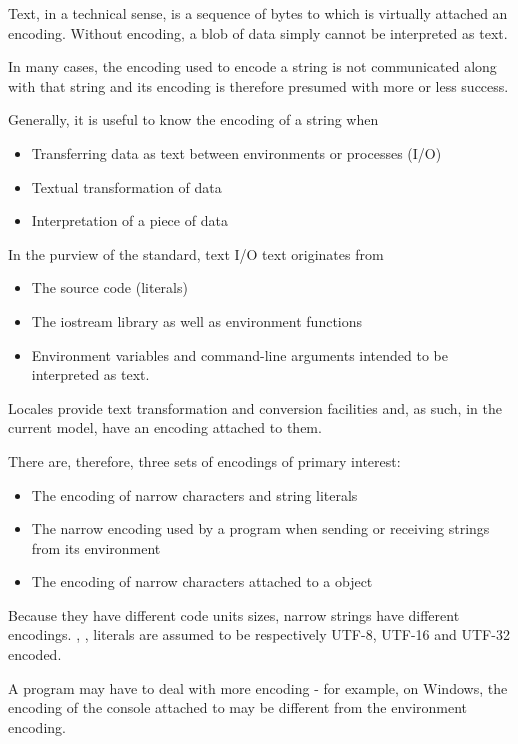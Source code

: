 \documentclass{wg21}
\begin{document}
Text, in a technical sense, is a sequence of bytes to which is virtually attached an encoding.
Without encoding, a blob of data simply cannot be interpreted as text.

In many cases, the encoding used to encode a string is not communicated along with that string and its
encoding is therefore presumed with more or less success.

Generally, it is useful to know the encoding of a string when

\begin{itemize}
    \item Transferring data as text between environments or processes (I/O)
    \item Textual transformation of data
    \item Interpretation of a piece of data
\end{itemize}

In the purview of the standard, text I/O text originates from
\begin{itemize}
    \item The source code (literals)
    \item The iostream library as well as environment functions
    \item Environment variables and command-line arguments intended to be interpreted as text.
\end{itemize}

Locales provide text transformation and conversion facilities and, as such, in the current model, have an encoding attached to them.

There are, therefore, three sets of encodings of primary interest:

\begin{itemize}
    \item The encoding of narrow characters and string literals
    \item The narrow encoding used by a program when sending or receiving strings from its environment
    \item The encoding of narrow characters attached to a  object
\end{itemize}

\note Because they have different code units sizes, narrow strings have different encodings.
, ,  literals are assumed to be respectively UTF-8, UTF-16 and UTF-32 encoded.
\endnote

\note A program may have to deal with more encoding - for example, on Windows, the encoding of the console attached to  may be different from the environment encoding.
\end{document}
